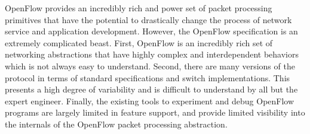 
OpenFlow provides an incredibly rich and power set of packet processing 
primitives that have the potential to drastically change the process of 
network service and application development. However, the OpenFlow 
specification is an extremely complicated beast. First, OpenFlow is an 
incredibly rich set of networking abstractions that have highly complex
and interdependent behaviors which is not always easy to understand. Second,
there are many versions of the protocol in terms of standard specifications
and switch implementations. This presents a high degree of variability and is
difficult to understand by all but the expert engineer. Finally, the existing
tools to experiment and debug OpenFlow programs are largely limited in feature
support, and provide limited visibility into the internals of the OpenFlow
packet processing abstraction.


